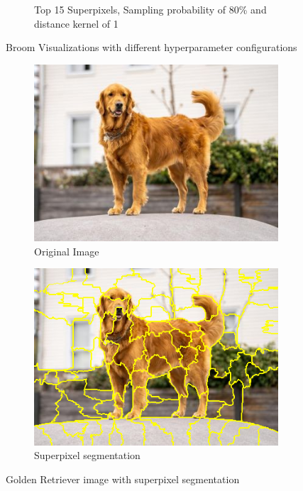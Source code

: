 \begin{figure}
\begin{subfigure}[t]{0.32\textwidth}
        \caption{Top 15 Superpixels, Sampling probability of 80\% and distance kernel of 1}
    \end{subfigure}
    \caption{Broom Visualizations with different hyperparameter configurations}
\end{figure}


\begin{figure}
    \captionsetup{justification=centering}

    \begin{subfigure}[t]{0.48\textwidth}
        \captionsetup{justification=centering}
        \centering
        \includegraphics[width=.7\linewidth]{figuras/lime/experiments/dog.jpg}
        \caption{Original Image}
    \end{subfigure}
    \hfill
    \begin{subfigure}[t]{0.48\textwidth}
        \captionsetup{justification=centering}
        \centering
        \includegraphics[width=.7\linewidth]{figuras/lime/experiments/dog_lime_segmentation.png}
        \caption{Superpixel segmentation}
    \end{subfigure}

    \caption{Golden Retriever image with superpixel segmentation}
\end{figure}

